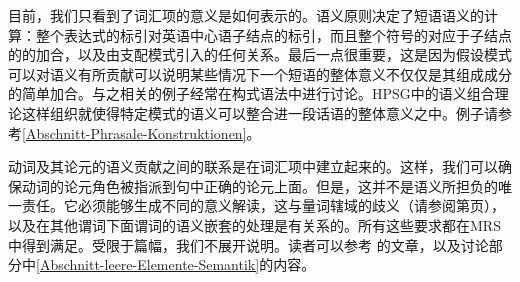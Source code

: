 目前，我们只看到了词汇项的意义是如何表示的。语义原则决定了短语语义的计算：整个表达式的标引对英语中心语子结点的标引，而且整个符号的\relsvc 对应于子结点的\relsvc 的加合，以及由支配模式引入的任何关系。最后一点很重要，这是因为假设模式可以对语义有所贡献可以说明某些情况下一个短语的整体意义不仅仅是其组成成分的简单加合。与之相关的例子经常在构式语法中进行讨论\indexcxgc。HPSG中的语义组合理论这样组织就使得特定模式的语义可以整合进一段话语的整体意义之中。例子请参考\ref{Abschnitt-Phrasale-Konstruktionen}。

动词及其论元的语义贡献之间的联系是在词汇项中建立起来的。这样，我们可以确保动词的论元角色被指派到句中正确的论元上面。但是，这并不是语义所担负的唯一责任。它必须能够生成不同的意义解读，这与量词辖域的歧义（请参阅第\pageref{Beispiel-Every-man-loves-a-woman}页），以及在其他谓词下面谓词的语义嵌套的处理是有关系的。所有这些要求都在MRS中得到满足。受限于篇幅，我们不展开说明。读者可以参考 \citet*{CFPS2005a}的文章，以及讨论部分中\ref{Abschnitt-leere-Elemente-Semantik}的内容。

